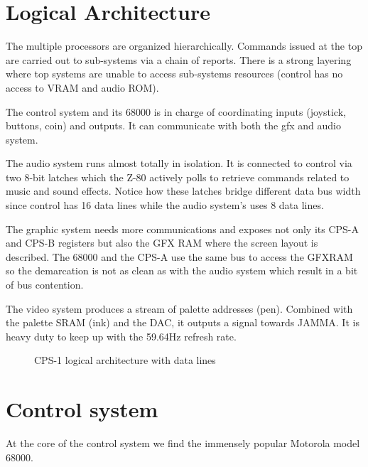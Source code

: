 \section{Logical Architecture}
The multiple processors are organized hierarchically. Commands issued at the top are carried out to sub-systems via a chain of reports. There is a strong layering where top systems are unable to access sub-systems resources (control has no access to VRAM and audio ROM).


The control system and its 68000 is in charge of coordinating inputs (joystick, buttons, coin) and outputs. It can communicate with both the gfx and audio system.

The audio system runs almost totally in isolation. It is connected to control via two 8-bit latches which the Z-80 actively polls to retrieve commands related to music and sound effects. Notice how these latches bridge different data bus width since control has 16 data lines while the audio system's uses 8 data lines.

The graphic system needs more communications and exposes not only its CPS-A and CPS-B registers but also the GFX RAM where the screen layout is described. The 68000 and the CPS-A use the same bus to access the GFXRAM so the demarcation is not as clean as with the audio system which result in a bit of bus contention.  

The video system produces a stream of palette addresses (pen). Combined with the palette SRAM (ink) and the DAC, it outputs a signal towards JAMMA.
It is heavy duty to keep up with the 59.64Hz refresh rate.

\begin{figure}[H]
  \caption*{CPS-1 logical architecture with data lines}
  \label{cps1_arch}
  \end{figure}



\section{Control system}
At the core of the control system we find the immensely popular Motorola model 68000.

